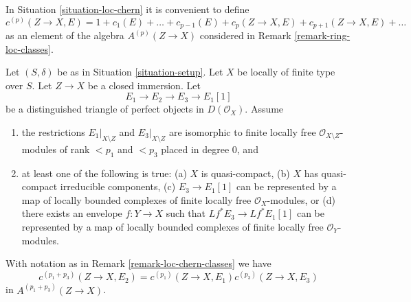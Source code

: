 \begin{remark}
\label{remark-loc-chern-classes}
In Situation \ref{situation-loc-chern} it is convenient to define
$$
c^{(p)}(Z \to X, E) = 1 + c_1(E) + \ldots + c_{p - 1}(E) +
c_p(Z \to X, E) + c_{p + 1}(Z \to X, E) + \ldots
$$
as an element of the algebra $A^{(p)}(Z \to X)$ considered in
Remark \ref{remark-ring-loc-classes}.
\end{remark}

\begin{lemma}
\label{lemma-additivity-loc-chern-c}
Let $(S, \delta)$ be as in Situation \ref{situation-setup}.
Let $X$ be locally of finite type over $S$. Let $Z \to X$ be
a closed immersion. Let
$$
E_1 \to E_2 \to E_3 \to E_1[1]
$$
be a distinguished triangle of perfect objects in $D(\mathcal{O}_X)$.
Assume
\begin{enumerate}
\item the restrictions $E_1|_{X \setminus Z}$ and $E_3|_{X \setminus Z}$
are isomorphic to finite locally free $\mathcal{O}_{X \setminus Z}$-modules
of rank $< p_1$ and $< p_3$ placed in degree $0$, and
\item at least one of the following is true:
(a) $X$ is quasi-compact,
(b) $X$ has quasi-compact irreducible components,
(c) $E_3 \to E_1[1]$ can be represented by a map of locally
bounded complexes of finite locally free $\mathcal{O}_X$-modules, or
(d) there exists an envelope $f : Y \to X$ such that $Lf^*E_3 \to Lf^*E_1[1]$
can be represented by a map of locally bounded complexes of
finite locally free $\mathcal{O}_Y$-modules.
\end{enumerate}
With notation as in Remark \ref{remark-loc-chern-classes} we have
$$
c^{(p_1 + p_3)}(Z \to X, E_2) = c^{(p_1)}(Z \to X, E_1)c^{(p_3)}(Z \to X, E_3)
$$
in $A^{(p_1 + p_3)}(Z \to X)$.
\end{lemma}

